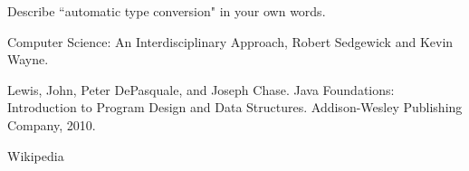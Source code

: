 \begin{exercise}
Describe ``automatic type conversion" in your own words. 
\end{exercise}


Computer Science: An Interdisciplinary Approach, Robert Sedgewick and Kevin Wayne.

Lewis, John, Peter DePasquale, and Joseph Chase. Java Foundations: Introduction to Program Design and Data Structures. Addison-Wesley Publishing Company, 2010.

Wikipedia

